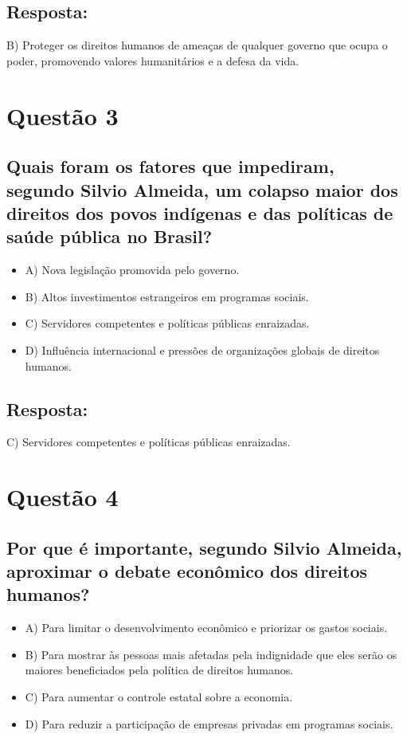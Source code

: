 \documentclass[
   article,       
   12pt,          
   oneside,       
   a4paper,       
   english,       
   brazil,        
   sumario=tradicional
   ]{abntex2}
\begin{document}
\subsection{Resposta:}
B) Proteger os direitos humanos de ameaças de qualquer governo que ocupa o poder, promovendo valores humanitários e a defesa da vida.


\section{Questão 3}
\subsection*{Quais foram os fatores que impediram, segundo Silvio Almeida, um colapso maior dos direitos dos povos indígenas e das políticas de saúde pública no Brasil?}
\begin{itemize}
    \item A) Nova legislação promovida pelo governo.
    \item B) Altos investimentos estrangeiros em programas sociais.
    \item C) Servidores competentes e políticas públicas enraizadas.
    \item D) Influência internacional e pressões de organizações globais de direitos humanos.
\end{itemize}
\subsection{Resposta:}
C) Servidores competentes e políticas públicas enraizadas.


\section{Questão 4}
\subsection*{Por que é importante, segundo Silvio Almeida, aproximar o debate econômico dos direitos humanos?}
\begin{itemize}
    \item A) Para limitar o desenvolvimento econômico e priorizar os gastos sociais.
    \item B) Para mostrar às pessoas mais afetadas pela indignidade que eles serão os maiores beneficiados pela política de direitos humanos.
    \item C) Para aumentar o controle estatal sobre a economia.
    \item D) Para reduzir a participação de empresas privadas em programas sociais.
\end{itemize}
\end{document}
